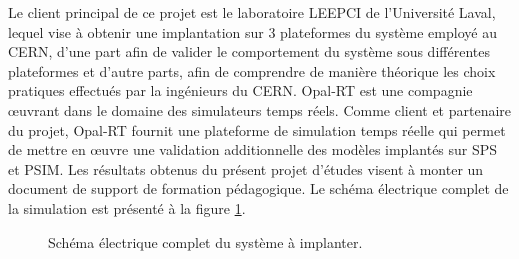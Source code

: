 Le client principal de ce projet est le laboratoire LEEPCI de l'Université Laval, lequel vise à obtenir une implantation sur 3 plateformes du système employé au CERN, d'une part afin de valider le comportement du système sous différentes plateformes et d'autre parts, afin de comprendre de manière théorique les choix pratiques effectués par la ingénieurs du CERN. Opal-RT est une compagnie œuvrant dans le domaine des simulateurs temps réels. Comme client et partenaire du projet, Opal-RT fournit une plateforme de simulation temps réelle qui permet de mettre en œuvre une validation additionnelle des modèles implantés sur SPS et PSIM. Les résultats obtenus du présent projet d'études visent à monter un document de support de formation pédagogique. Le schéma électrique complet de la simulation est présenté à la figure \ref{fig_circuit_electrique_complet}.

\begin{figure}[htb]
\centering
{}
\caption{Schéma électrique complet du système à implanter.}
\label{fig_circuit_electrique_complet}
\end{figure}
